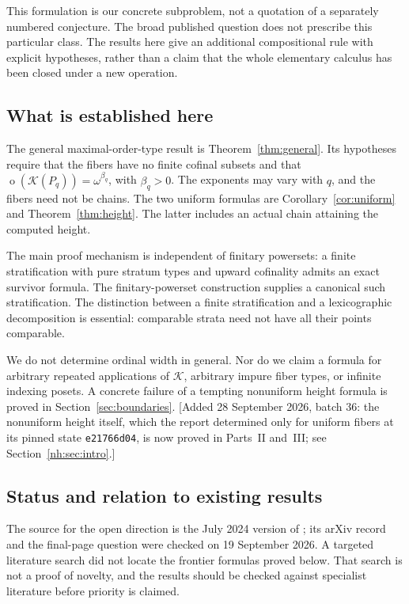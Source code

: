\documentclass[11pt,a4paper]{article}
\theoremstyle{definition}
\theoremstyle{remark}
\newcommand{\K}{\mathcal K}
\newcommand{\ot}{\operatorname{o}}
\begin{document}
This formulation is our concrete subproblem, not a quotation of a separately
numbered conjecture. The broad published question does not prescribe this
particular class. The results here give an additional compositional rule
with explicit hypotheses, rather than a claim that the whole elementary
calculus has been closed under a new operation.

\subsection{What is established here}

The general maximal-order-type result is Theorem~\ref{thm:general}. Its
hypotheses require that the fibers have no finite cofinal subsets and that
$\ot(\K(P_q))=\omega^{\beta_q}$, with $\beta_q>0$. The exponents may vary
with $q$, and the fibers need not be chains. The two uniform formulas are
Corollary~\ref{cor:uniform} and Theorem~\ref{thm:height}. The latter includes
an actual chain attaining the computed height.

The main proof mechanism is independent of finitary powersets: a finite
stratification with pure stratum types and upward cofinality admits an
exact survivor formula. The finitary-powerset construction supplies a
canonical such stratification. The distinction between a finite
stratification and a lexicographic decomposition is essential: comparable
strata need not have all their points comparable.

We do not determine ordinal width in general. Nor do we claim a formula
for arbitrary repeated applications of $\K$, arbitrary impure fiber types,
or infinite indexing posets. A concrete failure of a tempting nonuniform
height formula is proved in Section~\ref{sec:boundaries}.
[Added 28 September 2026, batch 36: the nonuniform height itself, which
the report determined only for uniform fibers at its pinned state
\texttt{e21766d04}, is now proved in Parts~II and~III; see
Section~\ref{nh:sec:intro}.]

\subsection{Status and relation to existing results}

The source for the open direction is the July 2024 version of
\cite{AbriolaEtAl2024}; its arXiv record and the final-page question were
checked on 19 September 2026. A targeted literature search did not locate
the frontier formulas proved below. That search is not a proof of novelty,
and the results should be checked against specialist literature before
priority is claimed.
\end{document}
